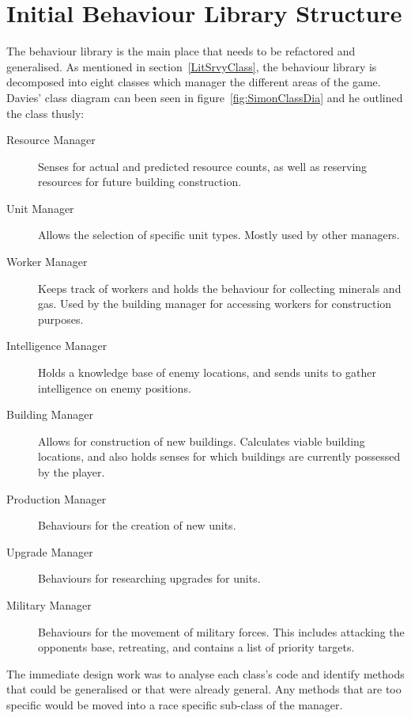 \documentclass[11pt,openright,a4paper]{report}
\begin{document}
\section{Initial Behaviour Library Structure}
The behaviour library is the main place that needs to be refactored and generalised. As mentioned in section~\ref{LitSrvyClass}, the behaviour library is decomposed into eight classes which manager the different areas of the game. Davies' class diagram can been seen in figure~\ref{fig:SimonClassDia} and he outlined the class thusly:
\begin{description}
\item[Resource Manager]{Senses for actual and predicted resource counts, as well as reserving resources for future building construction.}
\item[Unit Manager]{Allows the selection of specific unit types. Mostly used by other managers.}
\item[Worker Manager]{Keeps track of workers and holds the behaviour for collecting minerals and gas. Used by the building manager for accessing workers for construction purposes.}
\item[Intelligence Manager]{Holds a knowledge base of enemy locations, and sends units to gather intelligence on enemy positions.}
\item[Building Manager]{Allows for construction of new buildings. Calculates viable building locations, and also holds senses for which buildings are currently possessed by the player.}
\item[Production Manager]{Behaviours for the creation of new units.}
\item[Upgrade Manager]{Behaviours for researching upgrades for units.}
\item[Military Manager]{Behaviours for the movement of military forces. This includes attacking the opponents base, retreating, and contains a list of priority targets.}
\end{description}

The immediate design work was to analyse each class's code and identify methods that could be generalised or that were already general. Any methods that are too specific would be moved into a race specific sub-class of the manager.
\end{document}
